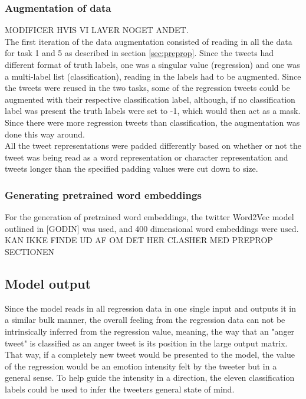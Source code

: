 \subsubsection*{Augmentation of data} \label{sec:augm}
MODIFICER HVIS VI LAVER NOGET ANDET.\\
The first iteration of the data augmentation consisted of reading in all the data for task 1 and 5 as described in section \ref{sec:preprop}. Since the tweets had different format of truth labels, one was a singular value (regression) and one was a multi-label list (classification), reading in the labels had to be augmented. Since the tweets were reused in the two tasks, some of the regression tweets could be augmented with their respective classification label, although, if no classification label was present the truth labels were set to -1, which would then act as a mask. Since there were more regression tweets than classification, the augmentation was done this way around.\\
All the tweet representations were padded differently based on whether or not the tweet was being read as a word representation or character representation and tweets longer than the specified padding values were cut down to size. 

\subsubsection*{Generating pretrained word embeddings}
For the generation of pretrained word embeddings, the twitter Word2Vec model outlined in [GODIN] was used, and 400 dimensional word embeddings were used.\\
KAN IKKE FINDE UD AF OM DET HER CLASHER MED PREPROP SECTIONEN

\subsection{Model output}
Since the model reads in all regression data in one single input and outputs it in a similar bulk manner, the overall feeling from the regression data can not be intrinsically inferred from the regression value, meaning, the way that an "anger tweet" is classified as an anger tweet is its position in the large output matrix. That way, if a completely new tweet would be presented to the model, the value of the regression would be an emotion intensity felt by the tweeter but in a general sense. To help guide the intensity in a direction, the eleven classification labels could be used to infer the tweeters general state of mind. 

